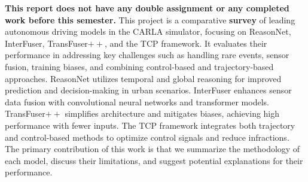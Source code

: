 \textbf{This report does not have any double assignment or any completed work before this semester.} This project is a comparative \textbf{survey} of leading autonomous driving models in the CARLA simulator, focusing on ReasonNet, InterFuser, TransFuser$++$, and the TCP framework. It evaluates their performance in addressing key challenges such as handling rare events, sensor fusion, training biases, and combining control-based and trajectory-based approaches. ReasonNet utilizes temporal and global reasoning for improved prediction and decision-making in urban scenarios. InterFuser enhances sensor data fusion with convolutional neural networks and transformer models. TransFuser$++$ simplifies architecture and mitigates biases, achieving high performance with fewer inputs. The TCP framework integrates both trajectory and control-based methods to optimize control signals and reduce infractions. The primary contribution of this work is that we summarize the methodology of each model, discuss their limitations, and suggest potential explanations for their performance.
